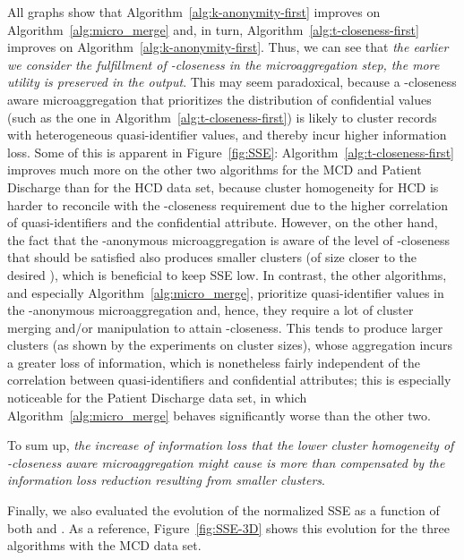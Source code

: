 \documentclass[10pt,journal,compsoc]{IEEEtran}
\theoremstyle{definition}
\theoremstyle{plain}
\begin{document}
All graphs show that Algorithm~\ref{alg:k-anonymity-first} 
improves on Algorithm~\ref{alg:micro_merge} and, in turn, 
Algorithm~\ref{alg:t-closeness-first} improves 
on Algorithm~\ref{alg:k-anonymity-first}.
Thus, we can see that {\em the earlier we consider
the fulfillment of -closeness in the microaggregation step, the
more utility is preserved in the output}. This may seem paradoxical, 
because a -closeness aware microaggregation that prioritizes 
the distribution of confidential values 
(such as the one in Algorithm~\ref{alg:t-closeness-first})
is likely to cluster records with heterogeneous quasi-identifier values, 
and thereby incur higher information loss. 
Some of this is apparent in Figure~\ref{fig:SSE}: 
Algorithm~\ref{alg:t-closeness-first} improves much more on
the other two algorithms for the MCD and Patient Discharge than for the HCD data set,
because cluster homogeneity for HCD is harder to 
reconcile with the -closeness requirement due to the higher
correlation of quasi-identifiers and the confidential attribute.
However, on the other hand, the fact that
the -anonymous microaggregation is aware of the level of -closeness that
should be satisfied also produces smaller clusters (of size closer 
to the desired ),
which is beneficial to keep SSE low.
In contrast, the other algorithms, and especially 
Algorithm~\ref{alg:micro_merge}, prioritize
quasi-identifier values in the -anonymous microaggregation and, 
hence, they require a lot of cluster merging and/or manipulation 
to attain -closeness.
This tends to produce larger clusters (as shown by the experiments
 on cluster sizes), 
whose aggregation incurs a greater loss of information, 
which is nonetheless fairly independent of the correlation
between quasi-identifiers and confidential attributes;
this is especially noticeable for the Patient Discharge data set,
in which Algorithm~\ref{alg:micro_merge} behaves significantly
worse than the other two.

To sum up, {\em the increase of information loss that the lower cluster
homogeneity of -closeness aware microaggregation might cause
is more than compensated by the information loss reduction 
resulting from smaller clusters}.

Finally, we also evaluated the evolution of the normalized SSE as a function of 
both  and . As a reference, Figure~\ref{fig:SSE-3D} shows 
this evolution for the three algorithms with the MCD data set.
\end{document}
